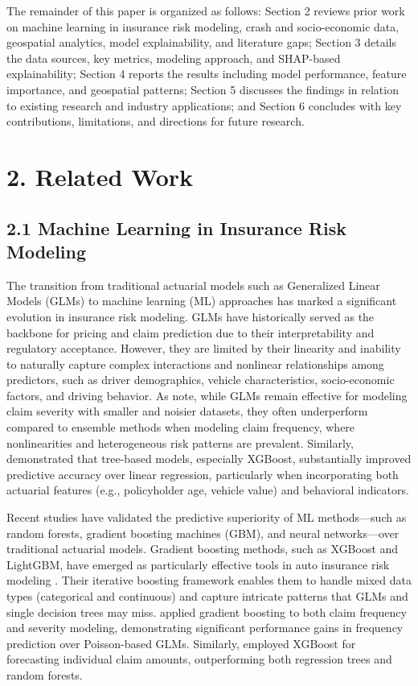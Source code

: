 \documentclass[
  number,
  review,
  3p]{elsarticle}
\begin{document}
The remainder of this paper is organized as follows: Section 2 reviews
prior work on machine learning in insurance risk modeling, crash and
socio-economic data, geospatial analytics, model explainability, and
literature gaps; Section 3 details the data sources, key metrics,
modeling approach, and SHAP-based explainability; Section 4 reports the
results including model performance, feature importance, and geospatial
patterns; Section 5 discusses the findings in relation to existing
research and industry applications; and Section 6 concludes with key
contributions, limitations, and directions for future research.

\section{2. Related Work}\label{related-work}

\subsection{\texorpdfstring{\textbf{2.1 Machine Learning in Insurance
Risk
Modeling}}{2.1 Machine Learning in Insurance Risk Modeling}}\label{machine-learning-in-insurance-risk-modeling}

The transition from traditional actuarial models such as Generalized
Linear Models (GLMs) to machine learning (ML) approaches has marked a
significant evolution in insurance risk modeling. GLMs have historically
served as the backbone for pricing and claim prediction due to their
interpretability and regulatory acceptance. However, they are limited by
their linearity and inability to naturally capture complex interactions
and nonlinear relationships among predictors, such as driver
demographics, vehicle characteristics, socio-economic factors, and
driving behavior. As \citep{clemente} note, while GLMs remain effective
for modeling claim severity with smaller and noisier datasets, they
often underperform compared to ensemble methods when modeling claim
frequency, where nonlinearities and heterogeneous risk patterns are
prevalent. Similarly, \citep{jonkheijm} demonstrated that tree-based
models, especially XGBoost, substantially improved predictive accuracy
over linear regression, particularly when incorporating both actuarial
features (e.g., policyholder age, vehicle value) and behavioral
indicators.

Recent studies have validated the predictive superiority of ML
methods---such as random forests, gradient boosting machines (GBM), and
neural networks---over traditional actuarial models. Gradient boosting
methods, such as XGBoost and LightGBM, have emerged as particularly
effective tools in auto insurance risk modeling \citep{henckaerts}.
Their iterative boosting framework enables them to handle mixed data
types (categorical and continuous) and capture intricate patterns that
GLMs and single decision trees may miss. \citep{clemente} applied
gradient boosting to both claim frequency and severity modeling,
demonstrating significant performance gains in frequency prediction over
Poisson-based GLMs. Similarly, \citep{jonkheijm} employed XGBoost for
forecasting individual claim amounts, outperforming both regression
trees and random forests.
\end{document}

